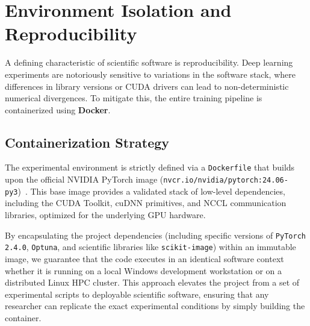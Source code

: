 \section{Environment Isolation and Reproducibility}
\label{sec:reproducibility}

A defining characteristic of scientific software is reproducibility.
Deep learning experiments are notoriously sensitive to variations in the software stack, where differences in library versions or CUDA drivers can lead to non-deterministic numerical divergences.
To mitigate this, the entire training pipeline is containerized using \textbf{Docker}.

\subsection{Containerization Strategy}
The experimental environment is strictly defined via a \texttt{Dockerfile} that builds upon the official NVIDIA PyTorch image (\texttt{nvcr.io/nvidia/pytorch:24.06-py3})~\cite{nvidia_pytorch_docker}.
This base image provides a validated stack of low-level dependencies, including the CUDA Toolkit, cuDNN primitives, and NCCL communication libraries, optimized for the underlying GPU hardware.

By encapsulating the project dependencies (including specific versions of \texttt{PyTorch 2.4.0}, \texttt{Optuna}, and scientific libraries like \texttt{scikit-image}) within an immutable image, we guarantee that the code executes in an identical software context whether it is running on a local Windows development workstation or on a distributed Linux HPC cluster.
This approach elevates the project from a set of experimental scripts to deployable scientific software, ensuring that any researcher can replicate the exact experimental conditions by simply building the container.

